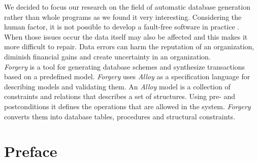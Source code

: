 \documentclass[oneside]{book}
\begin{document}
We decided to focus our research on the field of automatic database generation rather than whole programs as we found it very interesting. Considering the human factor, it is not possible to develop a fault-free software in practice \cite{reliability}. When those issues occur the data itself may also be affected and this makes it more difficult to repair. Data errors can harm the reputation of an organization, diminish financial gains and create uncertainty in an organization.\\

\textit{Forgery} is a tool for generating database schemes and synthesize transactions based on a predefined model. \textit{Forgery} uses \textit{Alloy} as a specification language for describing models and validating them. An \textit{Alloy} model is a collection of constraints and relations that describes a set of structures. Using pre- and postconditions it defines the operations that are allowed in the system. \textit{Forgery} converts them into database tables, procedures and structural constraints.

\newpage

\chapter{Preface}
\end{document}
